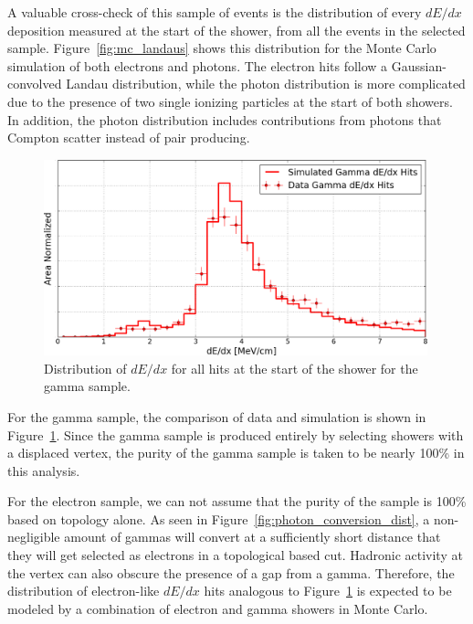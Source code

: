 A valuable cross-check of this sample of events is the distribution of every $dE/dx$ deposition measured at the start of the shower, from all the events in the selected sample.  Figure~\ref{fig:mc_landaus} shows this distribution for the Monte Carlo simulation of both electrons and photons.  The electron hits follow a Gaussian-convolved Landau distribution, while the photon distribution is more complicated due to the presence of two single ionizing particles at the start of both showers.  In addition, the photon distribution includes contributions from photons that Compton scatter instead of pair producing.

\begin{figure}[htb]
  \centering
  \includegraphics[width=0.99\textwidth]{emshower_figures/photons_landau_trimmed.png}
  \caption{Distribution of $dE/dx$ for all hits at the start of the shower for the gamma sample.}
  \label{fig:photon_landau}
 \end{figure} 

For the gamma sample, the comparison of data and simulation is shown in Figure~\ref{fig:photon_landau}.  Since the gamma sample is produced entirely by selecting showers with a displaced vertex, the purity of the gamma sample is 
taken to be nearly 100\% in this analysis.


For the electron sample, we can not assume that the purity of the sample is 100\% based on topology alone.  As seen in Figure~\ref{fig:photon_conversion_dist}, a non-negligible amount of gammas will convert at a sufficiently short distance that they will get selected as electrons in a topological based cut.  Hadronic activity at the vertex can also obscure the presence of a gap from a gamma.  Therefore, the distribution of electron-like $dE/dx$ hits analogous to Figure~\ref{fig:photon_landau} is expected to be modeled by a combination of electron and gamma showers in Monte Carlo.

